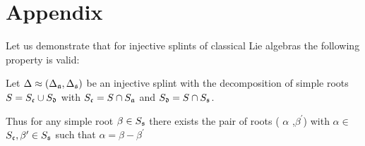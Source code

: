 

\section*{Appendix}


Let us demonstrate that for injective splints of classical Lie
algebras the following property is valid:
\begin{Prop}
Let $\Delta \approx (\Delta _{\mathfrak{a}},\Delta _{\frak{s}})$ be an
injective
splint with the decomposition of simple roots $S=S_{\frak{c}}\cup S_{\frak{d}%
}$ with $S_{\frak{c}}=S\cap S_{\mathfrak{a}}$ and $S_{\frak{d}}=S\cap S_{\frak{s}%
}$.
\end{Prop}
Thus for any simple root $\beta \in S_{\frak{s}}$ there exists the
pair of
roots ( $\alpha $ ,$\beta ^{\prime }$) with $\alpha \in $ $S_{\frak{c}%
},\beta ^{\prime }\in S_{\frak{s}}$ such that $\alpha =\beta
-\beta ^{\prime }$

